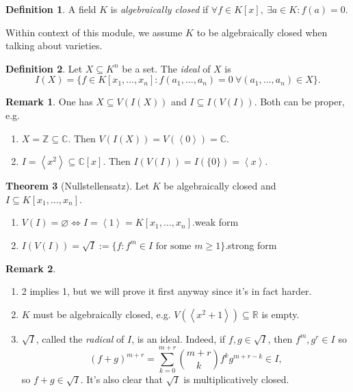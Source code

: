 \documentclass[a4paper]{article}
\newcommand{\la}{\left\langle}
\newcommand{\ra}{\right\rangle}
\newcommand{\Z}{\mathbb Z}
\newcommand{\C}{\mathbb C}
\theoremstyle{definition}
\newtheorem{defn}{Definition}[subsection]
\newtheorem{thm}[defn]{Theorem}
\newtheorem*{remark}{Remark}
\begin{document}
\begin{defn}
A field $K$ is \textit{algebraically closed} if $\forall f\in K[x],\ \exists a\in K:f(a)=0$.
\end{defn}
Within context of this module, we assume $K$ to be algebraically closed when talking about varieties.

\begin{defn}
Let $X\subseteq K^n$ be a set. The \textit{ideal} of $X$ is
\[
I(X)=\{f\in K[x_1,\ldots,x_n]:f(a_1,\ldots,a_n)=0 \ \forall (a_1,\ldots,a_n)\in X\}.
\]
\end{defn}

\begin{remark}
One has $X\subseteq V(I(X))$ and $I\subseteq I(V(I))$. Both can be proper, e.g.
\begin{enumerate}
\item $X=\Z\subseteq \C$. Then $V(I(X))=V(\la 0\ra)=\C$.
\item $I=\la x^2\ra\subseteq\C[x]$. Then $I(V(I))=I(\{0\})=\la x\ra$.
\end{enumerate}
\end{remark}

\begin{thm}[Nullstellensatz]
\label{thm:Nullstellensatz}
Let $K$ be algebraically closed and $I\subseteq K[x_1,\ldots,x_n]$.
\begin{enumerate}
\item $V(I)=\varnothing \Leftrightarrow I=\la 1\ra=K[x_1,\ldots,x_n]$.\hfill weak form
\item $I(V(I))=\sqrt I:=\{f:f^m\in I\text{ for some }m\geq 1\}$.\hfill strong form
\end{enumerate}
\end{thm}

\begin{remark}
\begin{enumerate}
\item 2 implies 1, but we will prove it first anyway since it's in fact harder.
\item $K$ must be algebraically closed, e.g. $V(\la x^2+1\ra)\subseteq \mathbb R$ is empty.
\item $\sqrt I$, called the \textit{radical} of $I$, is an ideal. Indeed, if $f,g\in \sqrt I$, then $f^m,g^r\in I$ so
\[
(f+g)^{m+r}=\sum_{k=0}^{m+r}\binom{m+r}{k}f^k g^{m+r-k} \in I,
\]
so $f+g\in\sqrt I$. It's also clear that $\sqrt I$ is multiplicatively closed.

\end{enumerate}
\end{remark}
\end{document}
